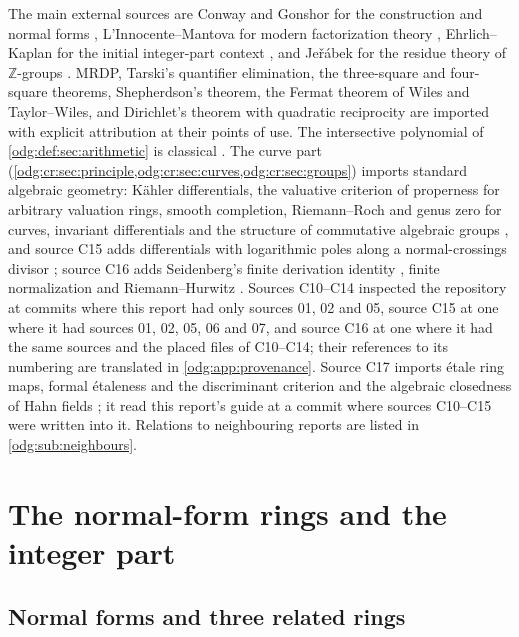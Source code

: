 \documentclass[11pt,oneside]{article}
\numberwithin{equation}{section}
\theoremstyle{definition}
\theoremstyle{remark}
\newcommand{\Z}{\mathbb Z}
\begin{document}
The main external sources are Conway and Gonshor for the construction and
normal forms \cite{Conway,Gonshor}, L'Innocente--Mantova for modern
factorization theory \cite{LM}, Ehrlich--Kaplan for the initial integer-part
context \cite{EK}, and Je\v r\'abek for the residue theory of $\Z$-groups
\cite{JerabekMLQ}. MRDP, Tarski's quantifier elimination, the three-square and
four-square theorems, Shepherdson's theorem, the Fermat theorem of Wiles and
Taylor--Wiles, and Dirichlet's theorem with quadratic reciprocity are imported
with explicit attribution at their points of use. The intersective polynomial
of \cref{odg:def:sec:arithmetic} is classical
\cite{BorevichShafarevich,LeSpencer,BerendBilu}. The curve part
(\cref{odg:cr:sec:principle,odg:cr:sec:curves,odg:cr:sec:groups}) imports standard
algebraic geometry: K\"ahler differentials, the valuative criterion of properness for
arbitrary valuation rings, smooth completion, Riemann--Roch and genus zero for curves,
invariant differentials and the structure of commutative algebraic groups
\cite{StacksDiff,StacksProper,StacksCurves,StacksRR,StacksGenusZero,MilneAV,MilneAG},
and source C15 adds differentials with logarithmic poles along a normal-crossings divisor
\cite{StacksLog}; source C16 adds Seidenberg's finite derivation identity
\cite{Seidenberg,Ciuperca}, finite normalization and Riemann--Hurwitz
\cite{StacksNormal,StacksRH}. Sources C10--C14 inspected the repository at commits where
this report had only sources 01, 02 and 05, source C15 at one where it had sources 01, 02,
05, 06 and 07, and source C16 at one where it had the same sources and the placed files
of C10--C14; their references to its numbering are translated in \cref{odg:app:provenance}.
Source C17 imports \'etale ring maps, formal \'etaleness and the discriminant criterion
\cite{StacksEtale,StacksFormal,StacksDisc} and the algebraic closedness of Hahn fields
\cite[Fact 2.1.1]{LM}; it read this report's guide at a commit where sources C10--C15 were
written into it.
Relations to neighbouring reports are listed in \cref{odg:sub:neighbours}.

\section{The normal-form rings and the integer part}\label{odg:sec:basic}

\subsection{Normal forms and three related rings}
\end{document}

